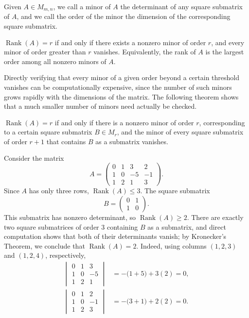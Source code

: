 \begin{definition}
Given $A \in M_{m,n}$, we call a minor of $A$ the determinant of any square submatrix of $A$, and we call the order of the minor the dimension of the corresponding square submatrix.
\end{definition}

\begin{proposition}
$\operatorname{Rank}(A) = r$ if and only if there exists a nonzero minor of order $r$, and every minor of order greater than $r$ vanishes. Equivalently, the rank of $A$ is the largest order among all nonzero minors of $A$.
\end{proposition}

Directly verifying that every minor of a given order beyond a certain threshold vanishes can be computationally expensive, since the number of such minors grows rapidly with the dimensions of the matrix. The following theorem shows that a much smaller number of minors need actually be checked.

\begin{theorem}
$\operatorname{Rank}(A) = r$ if and only if there is a nonzero minor of order $r$, corresponding to a certain square submatrix $B \in M_r$, and the minor of every square submatrix of order $r+1$ that contains $B$ as a submatrix vanishes.
\end{theorem}

\begin{example}
Consider the matrix
\[
A = \begin{pmatrix} 0 & 1 & 3 & 2 \\ 1 & 0 & -5 & -1 \\ 1 & 2 & 1 & 3 \end{pmatrix}.
\]
Since $A$ has only three rows, $\operatorname{Rank}(A) \leq 3$. The square submatrix
\[
B = \begin{pmatrix} 0 & 1 \\ 1 & 0
\end{pmatrix}.
\]
This submatrix has nonzero determinant, so $\operatorname{Rank}(A) \geq 2$. There are exactly two square submatrices of order $3$ containing $B$ as a submatrix, and direct computation shows that both of their determinants vanish; by Kronecker's Theorem, we conclude that $\operatorname{Rank}(A) = 2$.
Indeed, using columns $(1,2,3)$ and $(1,2,4)$, respectively,
\[
\begin{aligned}
\begin{vmatrix}0&1&3\\1&0&-5\\1&2&1\end{vmatrix}
&=-\bigl(1+5\bigr)+3(2)=0,\\
\begin{vmatrix}0&1&2\\1&0&-1\\1&2&3\end{vmatrix}
&=-\bigl(3+1\bigr)+2(2)=0.
\end{aligned}
\]
\end{example}

